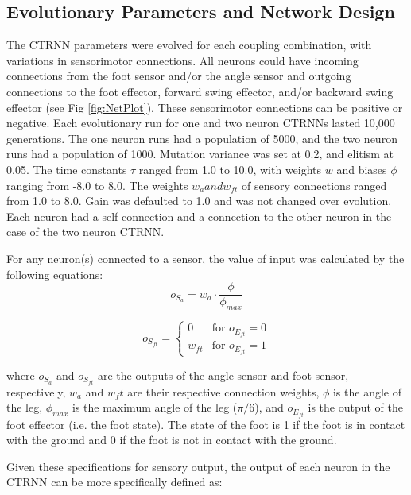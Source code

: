 \documentclass{article}
\begin{document}
\subsection{Evolutionary Parameters and Network Design} The CTRNN parameters were evolved for each coupling combination, with variations in sensorimotor connections. All neurons could have incoming connections from the foot sensor and/or the angle sensor and outgoing connections to the foot effector, forward swing effector, and/or backward swing effector (see Fig \ref{fig:NetPlot}). These sensorimotor connections can be positive or negative. 
Each evolutionary run for one and two neuron CTRNNs lasted 10,000 generations. The one neuron runs had a population of 5000, and the two neuron runs had a population of 1000. Mutation variance was set at 0.2, and elitism at 0.05. The time constants \(\tau\) ranged from 1.0 to 10.0, with weights \(w\) and biases \(\phi\) ranging from -8.0 to 8.0. The weights \(w_a and w_{ft}\) of sensory connections ranged from 1.0 to 8.0. Gain was defaulted to 1.0 and was not changed over evolution. Each neuron had a self-connection and a connection to the other neuron in the case of the two neuron CTRNN.




For any neuron(s) connected to a sensor, the value of input was calculated by the following equations:
\begin{equation}
o_{S_{a}} = w_a \cdot \frac{ \phi  }{ \phi_{max} }
\end{equation}

\begin{equation}
o_{S_{ft}} = 
\begin{cases} 
0 & \text{for } o_{{E}_{ft}} = 0 \\
w_{ft} & \text{for } o_{{E}_{ft}} = 1
\end{cases}
\end{equation}

where \(o_{S_{a}}\) and \(o_{S_{ft}}\) are the outputs of the angle sensor and foot sensor, respectively, \(w_a\) and \(w_ft\) are their respective connection weights, \(\phi\) is the angle of the leg, \(\phi_{max}\) is the maximum angle of the leg (\(\pi/6\)), and \(o_{{E}_{ft}}\) is the output of the foot effector (i.e. the foot state). The state of the foot is 1 if the foot is in contact with the ground and 0 if the foot is not in contact with the ground.

Given these specifications for sensory output, the output of each neuron in the CTRNN can be more specifically defined as:
\end{document}
